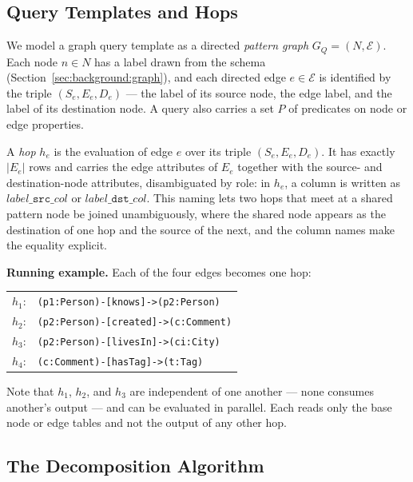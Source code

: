 \subsection{Query Templates and Hops}
\label{sec:decomposition:model}

We model a graph query template as a directed \emph{pattern graph} $G_Q = (N,
\mathcal{E})$. Each node $n \in N$ has a label drawn from the schema 
(Section~\ref{sec:background:graph}), and each directed edge 
$e \in \mathcal{E}$ is identified by the triple $(S_e, E_e, D_e)$ --- 
the label of its source node, the edge label, and the label of its 
destination node. A query
also carries a set $P$ of predicates on node or edge properties.

A \emph{hop} $h_e$ is the \onehop evaluation of edge $e$ over its triple
$(S_e, E_e, D_e)$. It has exactly $|E_e|$ rows and carries the edge
attributes of $E_e$ together with the source- and destination-node
attributes, disambiguated by role: in $h_e$, a column is written as
$\mathit{label}\_\texttt{src}\_\mathit{col}$ or
$\mathit{label}\_\texttt{dst}\_\mathit{col}$. This naming lets two hops
that meet at a shared pattern node be joined unambiguously, where the shared node
appears as the destination of one hop and the source of the next, and the
column names make the equality explicit.

\noindent\textbf{Running example.} Each of the four edges becomes one hop:
\begin{center}
\small
\begin{tabular}{@{}ll@{}}
$h_1$: & \texttt{(p1:Person)-[knows]->(p2:Person)} \\
$h_2$: & \texttt{(p2:Person)-[created]->(c:Comment)} \\
$h_3$: & \texttt{(p2:Person)-[livesIn]->(ci:City)} \\
$h_4$: & \texttt{(c:Comment)-[hasTag]->(t:Tag)} \\
\end{tabular}
\end{center}
Note that $h_1$, $h_2$, and $h_3$
are independent of one another --- none consumes another's output --- and
can be evaluated in parallel. Each \onehop reads
only the base node or edge tables and not the output of any other hop.

\subsection{The Decomposition Algorithm}
\label{sec:decomposition:algorithm}


